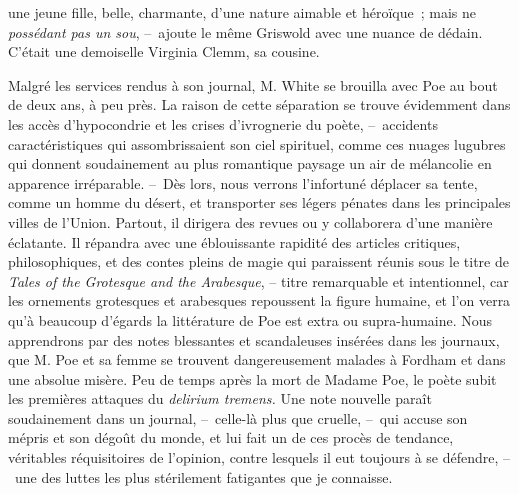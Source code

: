\documentclass[french,twoside]{book} %
\begin{document}
une jeune fille, belle, charmante, d’une nature aimable et héroïque ; mais ne \emph{possédant pas un sou}, – ajoute le même Griswold avec une nuance de dédain. C’était une demoiselle Virginia Clemm, sa cousine.\par
Malgré les services rendus à son journal, M. White se brouilla avec Poe au bout de deux ans, à peu près. La raison de cette séparation se trouve évidemment dans les accès d’hypocondrie et les crises d’ivrognerie du poète, – accidents caractéristiques qui assombrissaient son ciel spirituel, comme ces nuages lugubres qui donnent soudainement au plus romantique paysage un air de mélancolie en apparence irréparable. – Dès lors, nous verrons l’infortuné déplacer sa tente, comme un homme du désert, et transporter ses légers pénates dans les principales villes de l’Union. Partout, il dirigera des revues ou y collaborera d’une manière éclatante. Il répandra avec une éblouissante rapidité des articles critiques, philosophiques, et des contes pleins de magie qui paraissent réunis sous le titre de \emph{Tales of the Grotesque and the Arabesque}, – titre remarquable et intentionnel, car les ornements grotesques et arabesques repoussent la figure humaine, et l’on verra qu’à beaucoup d’égards la littérature de Poe est extra ou supra-humaine. Nous apprendrons par des notes blessantes et scandaleuses insérées dans les journaux, que M. Poe et sa femme se trouvent dangereusement malades à Fordham et dans une absolue misère. Peu de temps après la mort de Madame Poe, le poète subit les premières attaques du \emph{delirium tremens.} Une note nouvelle paraît soudainement dans un journal, – celle-là plus que cruelle, – qui accuse son mépris et son dégoût du monde, et lui fait un de ces procès de tendance, véritables réquisitoires de l’opinion, contre lesquels il eut toujours à se défendre, – une des luttes les plus stérilement fatigantes que je connaisse.\par
\end{document}
